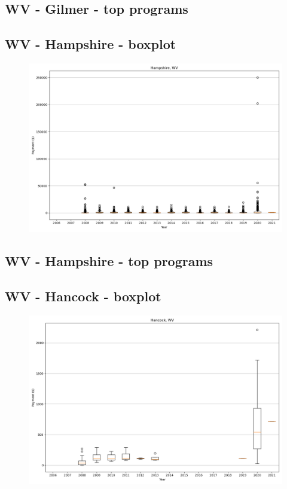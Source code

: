 \subsection*{WV - Gilmer - top programs}

\newpage
\subsection*{WV - Hampshire - boxplot}
\begin{figure}[h]
\centering
\includegraphics[width=7in]{../output/boxplots/counties/Hampshire-WV_boxplot.png}
\end{figure}


\subsection*{WV - Hampshire - top programs}

\newpage
\subsection*{WV - Hancock - boxplot}
\begin{figure}[h]
\centering
\includegraphics[width=7in]{../output/boxplots/counties/Hancock-WV_boxplot.png}
\end{figure}



